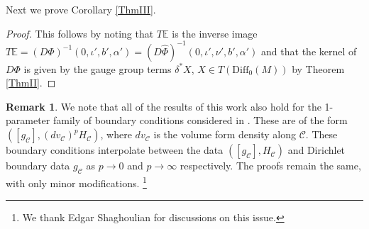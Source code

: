 \documentclass[10pt]{amsart}
\renewcommand{\a}{\alpha}
\renewcommand{\d}{\delta}
\newcommand{\cC}{{\mathcal C}}
\newcommand{\bE}{\mathbb E}
\newcommand{\Diff}{\mathrm{Diff}}
\renewcommand{\to}{\rightarrow}
\renewcommand{\hat}{\widehat}
\newcommand{\<}{\langle}
\renewcommand{\>}{\rangle}
\theoremstyle{plain}
\theoremstyle{remark}
\theoremstyle{definition}
\newtheorem{remark}[lemma]{Remark}
\numberwithin{equation}{section}
\begin{document}
 Next we prove Corollary \ref{ThmIII}. 
 
\begin{proof}
This follows by noting that $T\bE$ is the inverse image $T\bE = (D\Phi)^{-1}(0, \iota', b', \a') = (D\hat \Phi)^{-1}(0, \iota', \nu', b', \a')$ 
and that the kernel of $D\Phi$ is given by the gauge group terms $\d^*X$, $X \in T(\Diff_0(M))$ by Theorem \ref{ThmII}. 


\end{proof}


\begin{remark}
{\rm We note that all of the results of this work also hold for the 1-parameter family of boundary conditions considered in \cite{LSW}. These 
are of the form $([g_{\cC}], (dv_{\cC})^p H_{\cC})$, where $dv_{\cC}$ is the volume form density along $\cC$. These boundary conditions 
interpolate between the data $([g_{\cC}], H_{\cC})$ and Dirichlet boundary data $g_{\cC}$ as $p \to 0$ and $p \to \infty$ respectively. 
The proofs remain the same, with only minor modifications. \footnote{We thank Edgar Shaghoulian for discussions on this issue.}

}
\end{remark}




\end{document}
